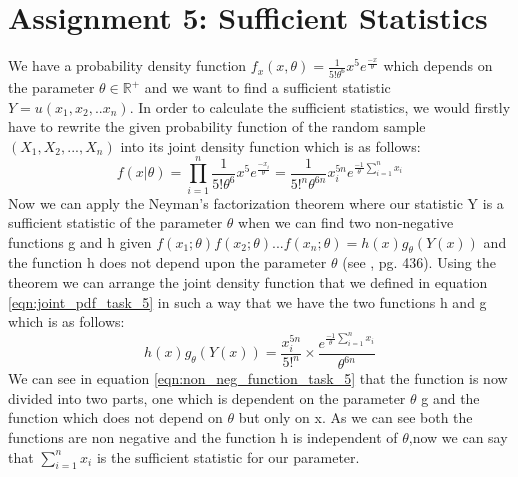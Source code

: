 \chapter{Assignment 5: Sufficient Statistics}
We have a probability density function $f_x(x,\theta) = \frac{1}{5! \theta^6}x^5e^{\frac{-x}{\theta}}$ which depends on the parameter $\theta \in \mathbb{R}^+$ and we want to find a sufficient statistic $Y=u(x_1, x_2,..x_n)$. In order to calculate the sufficient statistics, we would firstly have to rewrite the given probability function of the random sample $(X_1, X_2, ..., X_n)$ into its joint density function which is as follows:
\begin{equation} \label{eqn:joint_pdf_task_5}
        f(x|\theta) = \prod_{i=1}^{n} \frac{1}{5! \theta^6}x^5e^{\frac{-x_i}{\theta}} = \frac{1}{5!^n \theta^{6n}}x_i^{5n}e^{\frac{-1}{\theta} \sum_{i=1}^{n}x_i} 
\end{equation}
Now we can apply the Neyman's factorization theorem where our statistic Y is a sufficient statistic of the parameter $\theta$ when we can find two non-negative functions g and h given $f(x_1;\theta)f(x_2;\theta)...f(x_n;\theta)=h(x) g_{\theta}(Y(x))$ and the function h does not depend upon the parameter $\theta$ (see \cite{hogg:2005}, pg. 436). Using the theorem we can arrange the joint density function that we defined in equation \ref{eqn:joint_pdf_task_5} in such a way that we have the two functions h and g which is as follows:
\begin{equation} \label{eqn:non_neg_function_task_5}
   h(x) g_{\theta}(Y(x)) = \frac{x_i^{5n}}{5!^n} \times \frac{e^{\frac{-1}{\theta} \sum_{i=1}^{n}x_i}}{\theta^{6n}} 
\end{equation}\newline\newline
We can see in equation \ref{eqn:non_neg_function_task_5} that the function is now divided into two parts, one which is dependent on the parameter $\theta$ g and the function which does not depend on $\theta$ but only on x. As we can see both the functions are non negative and the function h is independent of $\theta$,now we can say that $\sum_{i=1}^{n}x_i$ is the sufficient statistic for our parameter. 